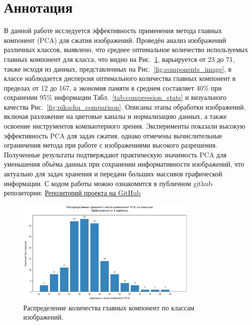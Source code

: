 \documentclass[14pt]{extarticle}
\begin{document}
\section{Аннотация}

В данной работе исследуется эффективность применения метода главных компонент (PCA) для сжатия изображений. Проведён анализ изображений различных классов, выявлено, что среднее оптимальное количество используемых главных компонент для класса, что видно на Рис.~\ref{fig:components_class}, варьируется от 23 до 71, также исходя из данных, представленных на Рис.~\ref{fig:components_image}, в классе наблюдается дисперсия оптимального количества главных компонент в пределах от 12 до 167, а экономия памяти в среднем составляет 40\% при сохранении 95\% информации Табл.~\ref{tab:compression_stats} и визуального качества Рис.~\ref{fig:pikachu_comparison}. Описаны этапы обработки изображений, включая разложение на цветовые каналы и нормализацию данных, а также освоение инструментов компьютерного зрения. Эксперименты показали высокую эффективность PCA для задач сжатия, однако отмечены вычислительные ограничения метода при работе с изображениями высокого разрешения. Полученные результаты подтверждают практическую значимость PCA для уменьшения объёма данных при сохранении информативности изображений, что актуально для задач хранения и передачи больших массивов графической информации. С кодом работы можно ознакомится в публичном github репозитории: \href{https://github.com/annetslxx/pca-research}{Репозиторий проекта на GitHub}

\begin{figure}[h]
\centering
\includegraphics[width=0.8\textwidth]{components_by_class.png}
\caption{Распределение количества главных компонент по классам изображений.}
\label{fig:components_class}
\end{figure}
\end{document}
